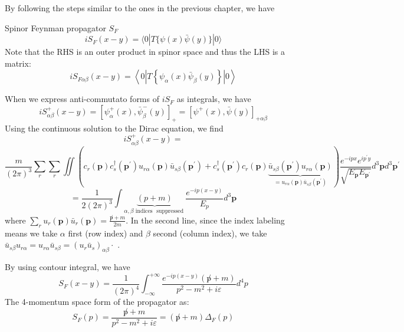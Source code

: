 By following the steps similar to the ones in the previous chapter, we have 
\begin{qt}
Spinor Feynman propagator $S_F$
\begin{equation}
    i S_{F}(x-y)=\langle 0|T\{\psi(x) \bar{\psi}(y)\}| 0\rangle
\end{equation}
Note that the RHS is an outer product in spinor space and thus the LHS is a matrix:
\begin{equation}
i S_{F \alpha \beta}(x-y)=\left\langle 0\left|T\left\{\psi_{\alpha}(x) \bar{\psi}_{\beta}(y)\right\}\right| 0\right\rangle
\end{equation}
\end{qt}
When we express anti-commutato forms of $iS_F$ as integrals, we have
\begin{equation}
i S_{\alpha \beta}^{+}(x-y)=\left[\psi_{\alpha}^{+}(x), \bar{\psi}_{\beta}^{-}(y)\right]_{+}=\left[\psi^{+}(x), \bar{\psi}(y)\right]_{+\alpha \beta}
\end{equation}
Using the continuous solution to the Dirac equation, we find
$$i S_{\alpha \beta}^{+}(x-y)=$$
$$
\frac{m}{(2 \pi)^{3}} \sum_{r} \sum_{r} \iint\left(c_{r}(\mathbf{p}) c_{s}^{\dagger}\left(\mathbf{p}^{\prime}\right) u_{r \alpha}(\mathbf{p}) \bar{u}_{s \beta}\left(\mathbf{p}^{\prime}\right)+c_{s}^{\dagger}\left(\mathbf{p}^{\prime}\right) c_{r}(\mathbf{p}) \underbrace{\bar{u}_{s\beta} \left(\mathbf{p}^{\prime}\right) u_{r \alpha}(\mathbf{p})}_{=u_{r \alpha}(\mathbf{p}) \bar{u}_{s \beta}\left(\mathbf{p}^{\prime}\right)}\right)\frac{e^{-i p x} e^{i p^{\prime} y}}{\sqrt{E_{\mathbf{p}} E_{\mathbf{p}^{\prime}}}} d^{3} \mathbf{p} d^{3} \mathbf{p}^{\prime}
$$
$$
=\frac{1}{2(2 \pi)^{3}} \int \underbrace{(p+m)}_{\alpha, \beta \text { indices } \text { suppressed }} \frac{e^{-i p(x-y)}}{E_{p}} d^{3} \mathbf{p}
$$
where $\sum_{r} u_{r}(\mathbf{p}) \bar{u}_{r}(\mathbf{p})=\frac{\not p+m}{2m}$. In the second line, since the index labeling means we take $\alpha$ first (row index) and $\beta$ second (column index), we take $\bar{u}_{s \beta} u_{r \alpha}=u_{r \alpha} \bar{u}_{s \beta}=\left(u_{r} \bar{u}_{s}\right)_{\alpha \beta} \cdot$ .
\begin{qt}
By using contour integral, we have
\begin{equation}
S_{F}(x-y)=\frac{1}{(2 \pi)^{4}} \int_{-\infty}^{+\infty} \frac{e^{-i p(x-y)}(\not p+m)}{p^{2}-m^{2}+i \varepsilon} d^{4} p
\end{equation}
The 4-momentum space form of the propagator as:
\begin{equation}
S_{F}(p)=\frac{\not p+m}{p^{2}-m^{2}+i \varepsilon}=(\not p+m) \Delta_{F}(p)
\end{equation}
\end{qt}
